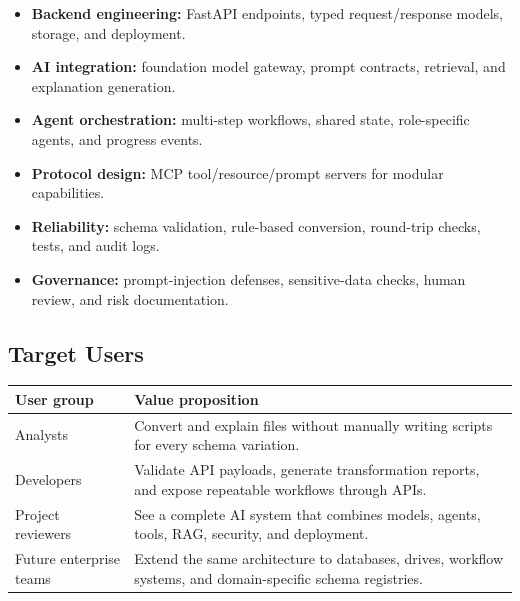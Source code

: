 \begin{itemize}
  \item \textbf{Backend engineering:} FastAPI endpoints, typed request/response models, storage, and deployment.
  \item \textbf{AI integration:} foundation model gateway, prompt contracts, retrieval, and explanation generation.
  \item \textbf{Agent orchestration:} multi-step workflows, shared state, role-specific agents, and progress events.
  \item \textbf{Protocol design:} MCP tool/resource/prompt servers for modular capabilities.
  \item \textbf{Reliability:} schema validation, rule-based conversion, round-trip checks, tests, and audit logs.
  \item \textbf{Governance:} prompt-injection defenses, sensitive-data checks, human review, and risk documentation.
\end{itemize}

\subsection{Target Users}

\begin{tabularx}{\textwidth}{p{}X}
\toprule
\textbf{User group} & \textbf{Value proposition} \\
\midrule
Analysts & Convert and explain files without manually writing scripts for every schema variation. \\
Developers & Validate API payloads, generate transformation reports, and expose repeatable workflows through APIs. \\
Project reviewers & See a complete AI system that combines models, agents, tools, RAG, security, and deployment. \\
Future enterprise teams & Extend the same architecture to databases, drives, workflow systems, and domain-specific schema registries. \\
\bottomrule
\end{tabularx}

